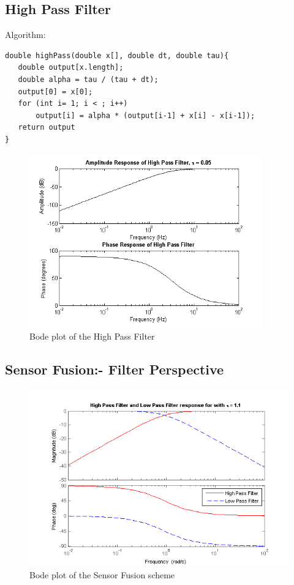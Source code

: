 \documentclass{article}
\theoremstyle{plain}
\theoremstyle{definition}
\theoremstyle{remark}
\begin{document}
\clearpage

\subsection{High Pass Filter}
Algorithm:
\begin{verbatim}
double highPass(double x[], double dt, double tau){
   double output[x.length];
   double alpha = tau / (tau + dt);
   output[0] = x[0];
   for (int i= 1; i < ; i++)
       output[i] = alpha * (output[i-1] + x[i] - x[i-1]);
   return output
}
\end{verbatim}

\begin{figure}[hbt]
\begin{center}
\includegraphics[width = 10cm]{bode_HPF}
\caption{Bode plot of the High Pass Filter}
\label{bode_HPF}
\end{center}
\end{figure}

\clearpage

\subsection{Sensor Fusion:- Filter Perspective}

\begin{figure}[hbt]
\begin{center}
\includegraphics[width = 12cm]{bode_SensorFusion}
\caption{Bode plot of the Sensor Fusion scheme}
\label{bode_SF}
\end{center}
\end{figure}
\end{document}
